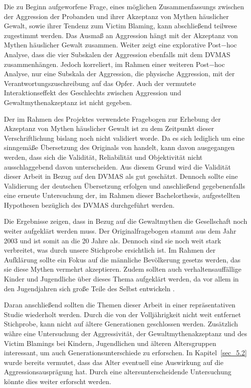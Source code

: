 Die zu Beginn aufgeworfene Frage, eines möglichen Zusammenfassungs zwischen der Aggression der Probanden und ihrer Akzeptanz von Mythen häuslicher Gewalt, sowie ihrer Tendenz zum Victim Blaming, kann abschließend teilwese zugestimmt werden. Das Ausmaß an Aggression hängt mit der Akzeptanz von Mythen häuslicher Gewalt zusammen. Weiter zeigt eine explorative Post$-$hoc Analyse, dass die vier Subskalen der Aggression ebenfalls mit dem DVMAS zusammenhängen. Jedoch korreliert, im Rahmen einer weiteren Post$-$hoc Analyse, nur eine Subskala der Aggression, die physische Aggression, mit der Verantwortungszuschreibung auf das Opfer. Auch der vermutete Interaktionseffekt des Geschlechts zwischen Aggression und Gewaltmythenakzeptanz ist nicht gegeben. 

Der im Rahmen des Projektes verwendete Fragebogen zur Erhebung der Akzeptanz von Mythen häuslicher Gewalt ist zu dem Zeitpunkt dieser Verschriftlichung bislang noch nicht validiert worde. Da es sich lediglich um eine sinngemäße Übersetzung des Originals von \textcite{Peters2003} handelt, kann davon ausgegangen werden, dass sich die Validität, Reliabilität und Objektivität nicht ausschlaggebend davon unterscheiden. Aus diesem Grund wird die Validität dieser Arbeit in Bezug auf den DVMAS als gut geschätzt. Dennoch sollte eine Validierung der deutschen Übersetzung erfolgen und anschließend gegebenenfalls eine erneute Untersuchung der, im Rahmen dieser Bachelorthesis, aufgestellten Hypothesen bezüglich des DVMAS durchgeführt werden. 

Die Ergebnisse zeigen, dass in Bezug auf die Gewaltmythen die Gesellschaft noch weiter aufgeklärt werden muss. Der Originalfragebogen stammt aus dem Jahr 2003 und ist somit an die 20 Jahre als. Dennoch sind sie noch weit stark verbreitet, was durch unsere Stichprobe ersichtlich ist. Im Rahmen der Aufklärung sollte ein Fokus auf die männliche Bevölkerung gesetzs werden, das sie diese Mythen vermehrt akzeptieren. Zudem sollten auch verhaltensauffällige Kinder und Jugendliche über dieses Thema aufgeklärt werden, da vor allem in den Jugendjahren sich große Teile des Selbst entwickeln \parencite{H1_Entwicklung}.

Daran anschließend sollten die Themen dieser Arbeit in einer repräsentativen Studie wiederholt werden. Durch die von der Volljährigkeit nicht weit entfernet Stichprobe, kann nicht auf ältere Generationen geschlossen werden. Zusätzlich währe eine Untersuchung der Aggressivität, der Gewaltmythenakzeptanz und des Victim Blamings bei Kindern, Jugendlichen und älteren Altersgruppen interessant, um auch Generationsunterschiede zu erforschen. In Kapitel~\ref{sec_5.2} wurde bereits vermutet, dass das Alter eventuell eine Auswirkung auf die Aggressionsausprägung hat. Durch eine altersunterscheidende Untersuchung könnte dies weiter erforscht werden. 

